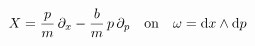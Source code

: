 \documentclass[preview]{standalone}
\begin{document}
\begin{align*}
\special{dvisvgm:raw <g id='unique000'>}X=\frac pm\,\partial_x-\frac bm\,p\,\partial_p\quad\text{on}\quad\omega=\mathrm{d}x\wedge\mathrm{d}p\special{dvisvgm:raw </g>}
\end{align*}
\end{document}
